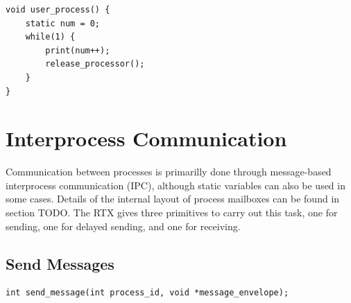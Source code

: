 \documentclass[12pt]{report}
\begin{document}
\begin{lstlisting}
void user_process() {
    static num = 0;
    while(1) {
        print(num++);
        release_processor();
    }
}
\end{lstlisting}

\section{Interprocess Communication}
\par Communication between processes is primarilly done through message-based interprocess communication (IPC), although static variables can also be used in some cases. Details of the internal layout of process mailboxes can be found in section TODO. The RTX gives three primitives to carry out this task, one for sending, one for delayed sending, and one for receiving.

\subsection{Send Messages}
\label{sec:send_message}
\begin{lstlisting}
int send_message(int process_id, void *message_envelope);
\end{lstlisting}
\end{document}
